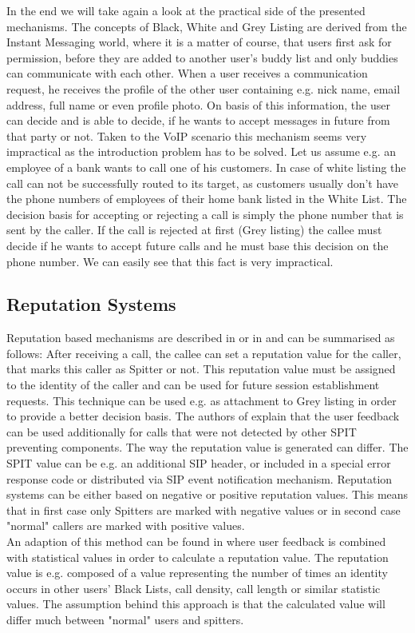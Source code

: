 \documentclass[final
	]{issa}
\begin{document}
In the end we will take again a look at the practical side of the presented mechanisms. The concepts of Black, White and Grey Listing are derived from the Instant Messaging world, where it is a matter of course, that users first ask for permission, before they are added to another user's buddy list and only buddies can communicate with each other. When a user receives a communication request, he receives the profile of the other user containing e.g. nick name, email address, full name or even profile photo. On basis of this information, the user can decide and is able to decide, if he wants to accept messages in future from that party or not. Taken to the VoIP scenario this mechanism seems very impractical as the introduction problem has to be solved. Let us assume e.g. an employee of a bank wants to call one of his customers. In case of white listing the call can not be successfully routed to its target, as customers usually don't have the phone numbers of employees of their home bank listed in the White List. The decision basis for accepting or rejecting a call is simply the phone number that is sent by the caller. If the call is rejected at first (Grey listing) the callee must decide if he wants to accept future calls and he must base this decision on the phone number. We can easily see that this fact is very impractical.
\subsection{Reputation Systems}
Reputation based mechanisms are described in \cite{rfcdraft:feedback} or in \cite{rfc:5039} and can be summarised as follows:
After receiving a call, the callee can set a reputation value for the caller, that marks this caller as Spitter or not. This reputation value must be assigned to the identity of the caller and can be used for future session establishment requests. This technique can be used e.g. as attachment to Grey listing \cite{rfc:5039} in order to provide a better decision basis. The authors of \cite{rfcdraft:feedback} explain that the user feedback can be used additionally for calls that were not detected by other SPIT preventing components. The way the reputation value is generated can differ. The SPIT value can be e.g. an additional SIP header, or included in a special error response code or distributed via SIP event notification mechanism. Reputation systems can be either based on negative or positive reputation values. This means that in first case only Spitters are marked with negative values or in second case "normal" callers are marked with positive values.\\
An adaption of this method can be found in \cite{paper:p2pavs} where user feedback is combined with statistical values in order to calculate a reputation value. The reputation value is e.g. composed of a value representing the number of times an identity occurs in other users' Black Lists, call density, call length or similar statistic values. The assumption behind this approach is that the calculated value will differ much between "normal" users and spitters.
\end{document}
